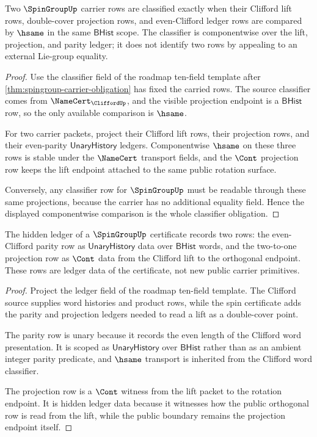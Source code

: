 \begin{theorem}\label{thm:spingroup-classifier-obligation}
Two $\SpinGroupUp$ carrier rows are classified exactly when their Clifford lift rows, double-cover projection rows, and even-Clifford ledger rows are compared by $\hsame$ in the same $\mathsf{BHist}$ scope. The classifier is componentwise over the lift, projection, and parity ledger; it does not identify two rows by appealing to an external Lie-group equality.
\end{theorem}
\begin{proof}
Use the classifier field of the roadmap ten-field template after \autoref{thm:spingroup-carrier-obligation} has fixed the carried rows. The source classifier comes from $\NameCert_{\CliffordUp}$, and the visible projection endpoint is a $\mathsf{BHist}$ row, so the only available comparison is $\hsame$.

For two carrier packets, project their Clifford lift rows, their projection rows, and their even-parity $\mathsf{UnaryHistory}$ ledgers. Componentwise $\hsame$ on these three rows is stable under the $\NameCert$ transport fields, and the $\Cont$ projection row keeps the lift endpoint attached to the same public rotation surface.

Conversely, any classifier row for $\SpinGroupUp$ must be readable through these same projections, because the carrier has no additional equality field. Hence the displayed componentwise comparison is the whole classifier obligation.
\end{proof}

\begin{theorem}\label{thm:spingroup-lift-parity-ledger}
The hidden ledger of a $\SpinGroupUp$ certificate records two rows: the even-Clifford parity row as $\mathsf{UnaryHistory}$ data over $\mathsf{BHist}$ words, and the two-to-one projection row as $\Cont$ data from the Clifford lift to the orthogonal endpoint. These rows are ledger data of the certificate, not new public carrier primitives.
\end{theorem}
\begin{proof}
Project the ledger field of the roadmap ten-field template. The Clifford source supplies word histories and product rows, while the spin certificate adds the parity and projection ledgers needed to read a lift as a double-cover point.

The parity row is unary because it records the even length of the Clifford word presentation. It is scoped as $\mathsf{UnaryHistory}$ over $\mathsf{BHist}$ rather than as an ambient integer parity predicate, and $\hsame$ transport is inherited from the Clifford word classifier.

The projection row is a $\Cont$ witness from the lift packet to the rotation endpoint. It is hidden ledger data because it witnesses how the public orthogonal row is read from the lift, while the public boundary remains the projection endpoint itself.
\end{proof}


